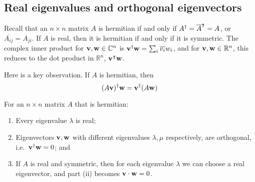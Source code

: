 \subsection{Real eigenvalues and orthogonal eigenvectors}
Recall that an \(n\times n\) matrix \(A\) is hermitian if and only if \(A^\dagger = \overline{A}^\intercal = A\), or \(\overline{A_{ij}} = A_{ji}\).
If \(A\) is real, then it is hermitian if and only if it is symmetric.
The complex inner product for \(\vb v, \vb w \in \mathbb C^n\) is \(\vb v^\dagger \vb w = \sum_i \overline{v_i}w_i\), and for \(\vb v, \vb w \in \mathbb R^n\), this reduces to the dot product in \(\mathbb R^n\), \(\vb v^\intercal \vb w\).

Here is a key observation.
If \(A\) is hermitian, then
\[
	(A\vb v)^\dagger \vb w = \vb v^\dagger (A \vb w)
\]
\begin{theorem}
	For an \(n \times n\) matrix \(A\) that is hermitian:
	\begin{enumerate}
		\item Every eigenvalue \(\lambda\) is real;
		\item Eigenvectors \(\vb v, \vb w\) with different eigenvalues \(\lambda, \mu\) respectively, are orthogonal, i.e.\ \(\vb v^\dagger \vb w = 0\); and
		\item If \(A\) is real and symmetric, then for each eigenvalue \(\lambda\) we can choose a real eigenvector, and part (ii) becomes \(\vb v \cdot \vb w = 0\).
	\end{enumerate}
\end{theorem}
